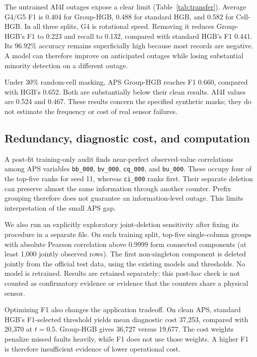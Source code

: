 \documentclass[conference]{IEEEtran}
\begin{document}
The untrained AI4I outages expose a clear limit (Table~\ref{tab:transfer}). Average G4/G5 F1 is 0.404 for Group-HGB, 0.488 for standard HGB, and 0.582 for Cell-HGB. In all three splits, G4 is rotational speed. Removing it reduces Group-HGB's F1 to 0.223 and recall to 0.132, compared with standard HGB's F1 0.441. Its 96.92\% accuracy remains superficially high because most records are negative. A model can therefore improve on anticipated outages while losing substantial minority detection on a different outage.

Under 30\% random-cell masking, APS Group-HGB reaches F1 0.660, compared with HGB's 0.652. Both are substantially below their clean results. AI4I values are 0.524 and 0.467. These results concern the specified synthetic masks; they do not estimate the frequency or cost of real sensor failures.

\subsection{Redundancy, diagnostic cost, and computation}
A post-fit training-only audit finds near-perfect observed-value correlations among APS variables \texttt{bb\_000}, \texttt{bv\_000}, \texttt{cq\_000}, and \texttt{bu\_000}. These occupy four of the top-five ranks for seed 11, whereas \texttt{ci\_000} ranks first. Their separate deletion can preserve almost the same information through another counter. Prefix grouping therefore does not guarantee an information-level outage. This limits interpretation of the small APS gap.

We also run an explicitly exploratory joint-deletion sensitivity after fixing its procedure in a separate file. On each training split, top-five single-column groups with absolute Pearson correlation above 0.9999 form connected components (at least 1,000 jointly observed rows). The first non-singleton component is deleted jointly from the official test data, using the existing models and thresholds. No model is retrained. Results are retained separately; this post-hoc check is not counted as confirmatory evidence or evidence that the counters share a physical sensor.

Optimizing F1 also changes the application tradeoff. On clean APS, standard HGB's F1-selected threshold yields mean diagnostic cost 37,253, compared with 20,370 at $t=0.5$. Group-HGB gives 36,727 versus 19,677. The cost weights penalize missed faults heavily, while F1 does not use those weights. A higher F1 is therefore insufficient evidence of lower operational cost.
\end{document}
